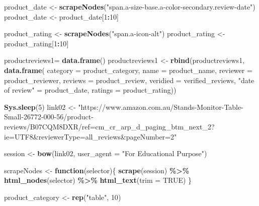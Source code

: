\documentclass[
]{article}
\newenvironment{Shaded}{\begin{snugshade}}{\end{snugshade}}
\newcommand{\AttributeTok}[1]{\textcolor[rgb]{0.13,0.29,0.53}{#1}}
\newcommand{\ConstantTok}[1]{\textcolor[rgb]{0.56,0.35,0.01}{#1}}
\newcommand{\ControlFlowTok}[1]{\textcolor[rgb]{0.13,0.29,0.53}{\textbf{#1}}}
\newcommand{\DecValTok}[1]{\textcolor[rgb]{0.00,0.00,0.81}{#1}}
\newcommand{\FunctionTok}[1]{\textcolor[rgb]{0.13,0.29,0.53}{\textbf{#1}}}
\newcommand{\NormalTok}[1]{#1}
\newcommand{\OtherTok}[1]{\textcolor[rgb]{0.56,0.35,0.01}{#1}}
\newcommand{\SpecialCharTok}[1]{\textcolor[rgb]{0.81,0.36,0.00}{\textbf{#1}}}
\newcommand{\StringTok}[1]{\textcolor[rgb]{0.31,0.60,0.02}{#1}}
\begin{document}
\begin{Shaded}
\begin{Highlighting}[]
\NormalTok{  product\_date }\OtherTok{\textless{}{-}} \FunctionTok{scrapeNodes}\NormalTok{(}\StringTok{"span.a{-}size{-}base.a{-}color{-}secondary.review{-}date"}\NormalTok{)}
\NormalTok{  product\_date }\OtherTok{\textless{}{-}}\NormalTok{ product\_date[}\DecValTok{1}\SpecialCharTok{:}\DecValTok{10}\NormalTok{]}
  
\NormalTok{  product\_rating }\OtherTok{\textless{}{-}} \FunctionTok{scrapeNodes}\NormalTok{(}\StringTok{"span.a{-}icon{-}alt"}\NormalTok{)}
\NormalTok{  product\_rating }\OtherTok{\textless{}{-}}\NormalTok{ product\_rating[}\DecValTok{1}\SpecialCharTok{:}\DecValTok{10}\NormalTok{]}
  
\NormalTok{  productreviews1}\OtherTok{=} \FunctionTok{data.frame}\NormalTok{()}
\NormalTok{  productreviews1 }\OtherTok{\textless{}{-}} \FunctionTok{rbind}\NormalTok{(productreviews1, }\FunctionTok{data.frame}\NormalTok{(}
                      \AttributeTok{category =}\NormalTok{ product\_category,}
                      \AttributeTok{name =}\NormalTok{ product\_name,}
                      \AttributeTok{reviewer =}\NormalTok{ product\_reviewer,}
                      \AttributeTok{reviews =}\NormalTok{ product\_review,}
                      \AttributeTok{veridied =}\NormalTok{ verified\_reviews,}
                      \StringTok{"date of review"} \OtherTok{=}\NormalTok{ product\_date,}
                      \AttributeTok{ratings =}\NormalTok{ product\_rating))}

  
 \FunctionTok{Sys.sleep}\NormalTok{(}\DecValTok{5}\NormalTok{)}
\NormalTok{link02 }\OtherTok{\textless{}{-}} \StringTok{"https://www.amazon.com.au/Stands{-}Monitor{-}Table{-}Small{-}26772{-}000{-}56/product{-}reviews/B07CQM8DXR/ref=cm\_cr\_arp\_d\_paging\_btm\_next\_2?ie=UTF8\&reviewerType=all\_reviews\&pageNumber=2"}


\NormalTok{  session }\OtherTok{\textless{}{-}} \FunctionTok{bow}\NormalTok{(link02,}
               \AttributeTok{user\_agent =} \StringTok{"For Educational Purpose"}\NormalTok{)}

\NormalTok{  scrapeNodes }\OtherTok{\textless{}{-}} \ControlFlowTok{function}\NormalTok{(selector)\{}
    \FunctionTok{scrape}\NormalTok{(session) }\SpecialCharTok{\%\textgreater{}\%}
      \FunctionTok{html\_nodes}\NormalTok{(selector) }\SpecialCharTok{\%\textgreater{}\%}
      \FunctionTok{html\_text}\NormalTok{(}\AttributeTok{trim =} \ConstantTok{TRUE}\NormalTok{)}
\NormalTok{  \}}

\NormalTok{  product\_category }\OtherTok{\textless{}{-}} \FunctionTok{rep}\NormalTok{(}\StringTok{"table"}\NormalTok{, }\DecValTok{10}\NormalTok{)}


\end{Highlighting}
\end{Shaded}
\end{document}
